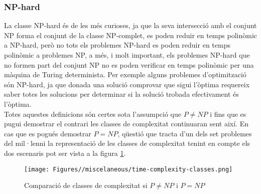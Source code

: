 \subsubsection{NP-hard}
La classe NP-hard és de les més curioses, ja que la seva intersecció amb el conjunt NP forma el conjunt de la classe NP-complet, es poden reduir en temps polinòmic a NP-hard, però no tots els problemes NP-hard es poden reduir en temps polinòmic a problemes NP, a més, i molt important, els problemes NP-hard que no formen part del conjunt NP no es poden verificar en temps polinòmic per una màquina de Turing determinista. Per exemple alguns problemes d'optimització són NP-hard, ja que donada una solució comprovar que sigui l'òptima requereix saber totes les solucions per determinar si la solució trobada efectivament és l'òptima.\\
Totes aquestes definicions són certes sota l'assumpció que \(P\neq NP\) i fins que es pugui demostrar el contrari les classes de complexitat continuaran sent així. En cas que es pogués demostrar \(P = NP\), qüestió que tracta d'un dels set problemes del mil·lenni la representació de les classes de complexitat tenint en compte els dos escenaris pot ser vista a la figura \ref{fig:time-complexity-sets}.

\begin{figure}
    \centering
    \texttt{[image: Figures//miscelaneous/time-complexity-classes.png]}
    \caption{Comparació de classes de complexitat si \(P\neq NP\) i \(P = NP\)}
    \label{fig:time-complexity-sets}
\end{figure}

